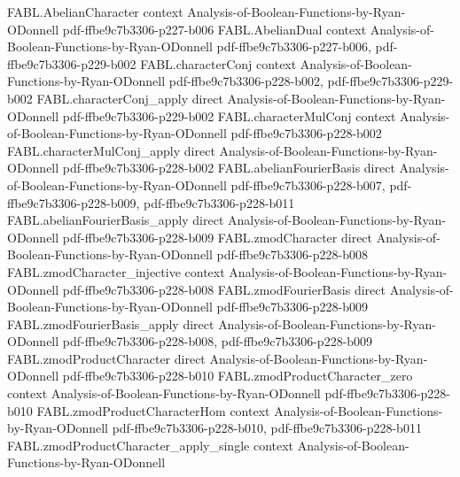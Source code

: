 \begin{theorem}
\label{FABL.zmodProductCharacter_apply}
\leanok
{}
\proofstep
  {FABL.AbelianCharacter}
  {context}
  {Analysis-of-Boolean-Functions-by-Ryan-ODonnell}
  {pdf-ffbe9c7b3306-p227-b006}
\proofstep
  {FABL.AbelianDual}
  {context}
  {Analysis-of-Boolean-Functions-by-Ryan-ODonnell}
  {pdf-ffbe9c7b3306-p227-b006,
    pdf-ffbe9c7b3306-p229-b002}
\proofstep
  {FABL.characterConj}
  {context}
  {Analysis-of-Boolean-Functions-by-Ryan-ODonnell}
  {pdf-ffbe9c7b3306-p228-b002,
    pdf-ffbe9c7b3306-p229-b002}
\proofstep
  {FABL.characterConj_apply}
  {direct}
  {Analysis-of-Boolean-Functions-by-Ryan-ODonnell}
  {pdf-ffbe9c7b3306-p229-b002}
\proofstep
  {FABL.characterMulConj}
  {context}
  {Analysis-of-Boolean-Functions-by-Ryan-ODonnell}
  {pdf-ffbe9c7b3306-p228-b002}
\proofstep
  {FABL.characterMulConj_apply}
  {direct}
  {Analysis-of-Boolean-Functions-by-Ryan-ODonnell}
  {pdf-ffbe9c7b3306-p228-b002}
\proofstep
  {FABL.abelianFourierBasis}
  {direct}
  {Analysis-of-Boolean-Functions-by-Ryan-ODonnell}
  {pdf-ffbe9c7b3306-p228-b007,
    pdf-ffbe9c7b3306-p228-b009,
    pdf-ffbe9c7b3306-p228-b011}
\proofstep
  {FABL.abelianFourierBasis_apply}
  {direct}
  {Analysis-of-Boolean-Functions-by-Ryan-ODonnell}
  {pdf-ffbe9c7b3306-p228-b009}
\proofstep
  {FABL.zmodCharacter}
  {direct}
  {Analysis-of-Boolean-Functions-by-Ryan-ODonnell}
  {pdf-ffbe9c7b3306-p228-b008}
\proofstep
  {FABL.zmodCharacter_injective}
  {context}
  {Analysis-of-Boolean-Functions-by-Ryan-ODonnell}
  {pdf-ffbe9c7b3306-p228-b008}
\proofstep
  {FABL.zmodFourierBasis}
  {direct}
  {Analysis-of-Boolean-Functions-by-Ryan-ODonnell}
  {pdf-ffbe9c7b3306-p228-b009}
\proofstep
  {FABL.zmodFourierBasis_apply}
  {direct}
  {Analysis-of-Boolean-Functions-by-Ryan-ODonnell}
  {pdf-ffbe9c7b3306-p228-b008,
    pdf-ffbe9c7b3306-p228-b009}
\proofstep
  {FABL.zmodProductCharacter}
  {direct}
  {Analysis-of-Boolean-Functions-by-Ryan-ODonnell}
  {pdf-ffbe9c7b3306-p228-b010}
\proofstep
  {FABL.zmodProductCharacter_zero}
  {context}
  {Analysis-of-Boolean-Functions-by-Ryan-ODonnell}
  {pdf-ffbe9c7b3306-p228-b010}
\proofstep
  {FABL.zmodProductCharacterHom}
  {context}
  {Analysis-of-Boolean-Functions-by-Ryan-ODonnell}
  {pdf-ffbe9c7b3306-p228-b010,
    pdf-ffbe9c7b3306-p228-b011}
\proofstep
  {FABL.zmodProductCharacter_apply_single}
  {context}
  {Analysis-of-Boolean-Functions-by-Ryan-ODonnell}

\end{theorem}
